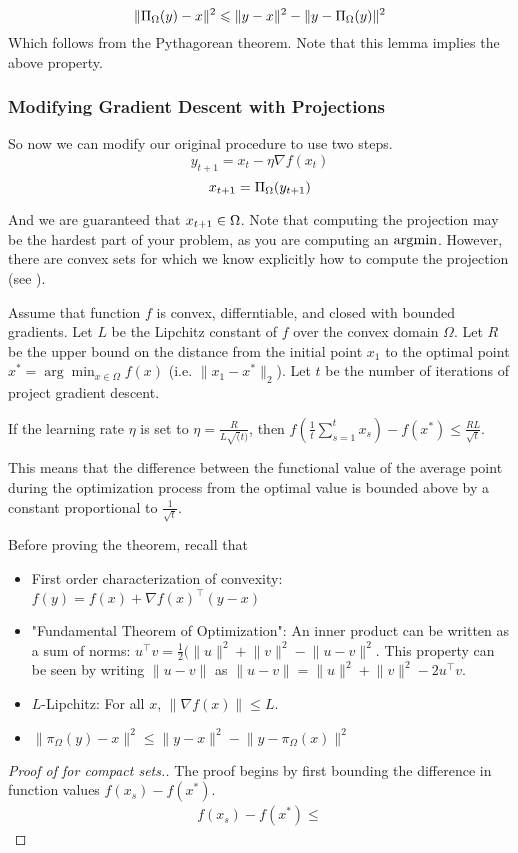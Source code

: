 \begin{lemma}
\[
\| \Pi_{\Omega}(y) - x \|^2 \leqslant \| y - x \|^2 - \| y - \Pi_{\Omega}(y) \|^2
\]
Which follows from the Pythagorean theorem. Note that this lemma implies the above property.
\end{lemma}

\subsubsection{Modifying Gradient Descent with Projections}

So now we can modify our original procedure to use two steps.
\[
y_{t+1} = x_t - \eta \nabla f(x_t)
\]
\[
x_{t+1} = \Pi_{\Omega}(y_{t+1})
\]

And we are guaranteed that $x_{t+1}\in\Omega$. Note that computing the projection may be the hardest part of your problem, as you are computing an $\operatorname*{\arg\!\min}$. However, there are convex sets for which we know explicitly how to compute the projection (see ).


\begin{theorem}
Assume that function $f$ is convex, differntiable, and closed with bounded gradients. Let $L$ be the Lipchitz constant of $f$ over the convex domain $\Omega$. Let $R$ be the upper bound on the distance from the initial point $x_1$ to the optimal point $x^* = \arg\min_{x \in \Omega} f(x)$ (i.e. $\lVert x_1 - x^* \rVert_2$). Let $t$ be the number of iterations of project gradient descent.

If the learning rate $\eta$ is set to $\eta=\frac{R}{L \sqrt(t)}$, then $f\left(\frac{1}{t}\sum_{s=1}^t x_s\right) - f\left(x^*\right) \leq \frac{RL}{\sqrt{t}}$.

This means that the difference between the functional value of the average point during the optimization process from the optimal value is bounded above by a constant proportional to $\frac{1}{\sqrt{t}}$.

\end{theorem}

Before proving the theorem, recall that
\begin{itemize}
    \item First order characterization of convexity: $f(y) = f(x) + \nabla f(x)^\top (y - x)$
    \item "Fundamental Theorem of Optimization": An inner product can be written as a sum of norms: $u^\top v = \frac{1}{2}(\lVert u \rVert^2 + \lVert v \lVert^2 - \lVert u - v \rVert^2$. This property can be seen by writing $\lVert u - v \rVert$ as $\lVert u - v \rVert = \lVert u \rVert^2 + \lVert v \lVert^2 - 2 u^\top v$.
    \item $L$-Lipchitz: For all $x$, $\lVert \nabla f(x) \rVert \leq L$.
    \item $\lVert \pi_\Omega (y) - x \rVert^2 \leq \lVert y - x \rVert^2 - \lVert y - \pi_\Omega (x) \rVert^2$ %
\end{itemize}


\begin{proof}[Proof of  for compact sets.]
The proof begins by first bounding the difference in function values $f(x_s) - f(x^*)$.
\begin{align}
    f(x_s) - f(x^*) \leq
\end{align}
\end{proof}
